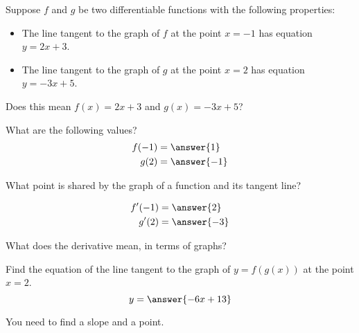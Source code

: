 \documentclass{ximera}
\author{Bobby Ramsey}
\begin{document}
\begin{exercise}
	Suppose $f$ and $g$ be two differentiable functions with the following properties:
	\begin{itemize}
		\item The line tangent to the graph of $f$ at the point $x=-1$ has equation $y=2x+3$.
		\item The line tangent to the graph of $g$ at the point $x=2$ has equation $y=-3x+5$.
	\end{itemize}

	Does this mean $f(x)=2x+3$ and $g(x) = -3x+5$?
	\begin{multipleChoice}
	\end{multipleChoice}

	\begin{exercise}
		What are the following values?
		\begin{align*}
			f(-1) &= \answer{1} \\
			g(2) &= \answer{-1}
		\end{align*}
		\begin{hint}
			What point is shared by the graph of a function and its tangent line?
		\end{hint}
		\begin{exercise}
			\begin{align*}
				f'(-1) &= \answer{2} \\
				g'(2) &= \answer{-3}
			\end{align*}
			\begin{hint}
				What does the derivative mean, in terms of graphs?
			\end{hint}

			\begin{exercise}
				Find the equation of the line tangent to the graph of $y=f( g( x ) )$ at the point $x=2$.
				\[ y = \answer{-6x+13} \]
				\begin{hint}
					You need to find a slope and a point.
				\end{hint}
			\end{exercise}		
		\end{exercise}
	\end{exercise}
\end{exercise}
\end{document}

